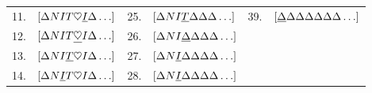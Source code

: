 \documentclass[a4paper,11pt]{article}[24.3.2010]
\begin{document}
\begin{enumerate}
\begin{table}[ht]
\begin{center}
\begin{tabular}{ l  l  l  l  l  l }
        11.& $[\Delta NIT\heartsuit\textcolor{black}{\underline{I}}\Delta\ldots]$ & 25.& $[\Delta NI\textcolor{black}{\underline{T}}\Delta\Delta\Delta\ldots]$ &39.& $[\textcolor{black}{\underline{\Delta}}\Delta\Delta\Delta\Delta\Delta\Delta\ldots]$\\
        12.& $[\Delta NIT\textcolor{black}{\underline{\heartsuit}}I\Delta\ldots]$ & 26.& $[\Delta NI\textcolor{black}{\underline{\Delta}}\Delta\Delta\Delta\ldots]$ &\\
        13.& $[\Delta NI\textcolor{black}{\underline{T}}\heartsuit I\Delta\ldots]$ & 27.& $[\Delta N\textcolor{black}{\underline{I}}\Delta\Delta\Delta\Delta\ldots]$ &\\
        14.& $[\Delta N\textcolor{black}{\underline{I}}T\heartsuit I\Delta\ldots]$ & 28.& $[\Delta N\textcolor{black}{\underline{I}}\Delta\Delta\Delta\Delta\ldots]$ &\\
        \end{tabular}
        \end{center}
        \end{table}







\end{enumerate}
\end{document}

